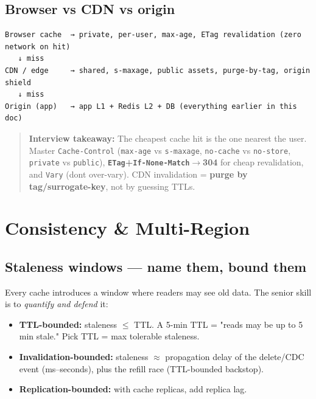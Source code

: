 \documentclass[11pt]{article}
\providecommand{\tightlist}{\setlength{\itemsep}{1pt}\setlength{\parskip}{0pt}}
\begin{document}
\subsection{Browser vs CDN vs origin}\label{browser-vs-cdn-vs-origin}

\setcodelang{}

\begin{verbatim}
Browser cache  → private, per-user, max-age, ETag revalidation (zero network on hit)
   ↓ miss
CDN / edge     → shared, s-maxage, public assets, purge-by-tag, origin shield
   ↓ miss
Origin (app)   → app L1 + Redis L2 + DB (everything earlier in this doc)
\end{verbatim}

\begin{quote}
\textbf{Interview takeaway:} The cheapest cache hit is the one nearest the user. Master \texttt{Cache-Control} (\texttt{max-age} vs \texttt{s-maxage}, \texttt{no-cache} vs \texttt{no-store}, \texttt{private} vs \texttt{public}), \textbf{\texttt{ETag}+\texttt{If-None-Match}\(\rightarrow\)304} for cheap revalidation, and \texttt{Vary} (don\textquotesingle t over-vary). CDN invalidation = \textbf{purge by tag/surrogate-key}, not by guessing TTLs.
\end{quote}

\section{Consistency \& Multi-Region}\label{consistency--multi-region}

\subsection{Staleness windows --- name them, bound them}\label{staleness-windows--name-them-bound-them}

Every cache introduces a window where readers may see old data. The senior skill is to \emph{quantify and defend} it:

\begin{itemize}
\tightlist
\item
  \textbf{TTL-bounded:} staleness \(\leq\) TTL. A 5-min TTL = "reads may be up to 5 min stale." Pick TTL = max tolerable staleness.
\item
  \textbf{Invalidation-bounded:} staleness \(\approx\) propagation delay of the delete/CDC event (ms--seconds), plus the refill race (TTL-bounded backstop).
\item
  \textbf{Replication-bounded:} with cache replicas, add replica lag.
\end{itemize}
\end{document}
